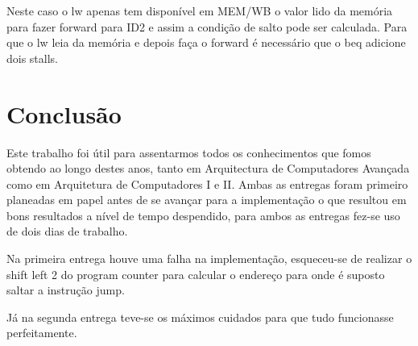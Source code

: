 \documentclass[pdftex,12pt,a4paper]{report}
\begin{document}
Neste caso o lw apenas tem disponível em MEM/WB o valor lido da memória para fazer forward para ID2 e assim a condição de salto pode ser calculada. Para que o lw leia da memória e depois faça o forward é necessário que o beq adicione dois stalls.

\newpage
\section{Conclusão}

Este trabalho foi útil para assentarmos todos os conhecimentos que fomos obtendo ao longo destes anos, tanto em Arquitectura de Computadores Avançada como em Arquitetura de Computadores I e II. Ambas as entregas foram primeiro planeadas em papel antes de se avançar para a implementação o que resultou em bons resultados a nível de tempo despendido, para ambos as entregas fez-se uso de dois dias de trabalho.

Na primeira entrega houve uma falha na implementação, esqueceu-se de realizar o shift left 2 do program counter para calcular o endereço para onde é suposto saltar a instrução jump.

Já na segunda entrega teve-se os máximos cuidados para que tudo funcionasse perfeitamente.
\end{document}
